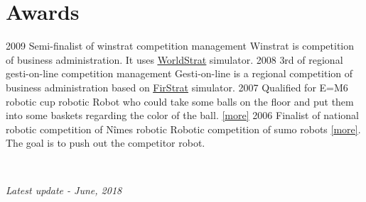 \documentclass[]{friggeri-cv}
\begin{document}
\section{Awards}
\begin{entrylist}
    \entry
        {2009}
	{Semi-finalist of winstrat competition}
        {management}
	{Winstrat is competition of business administration. It uses \href{http://www.stratelogic.com/worldstrat/}{\underline{WorldStrat}} simulator.}
    \entry
        {2008}
	{3rd of regional gesti-on-line competition}
        {management}
	{Gesti-on-line is a regional competition of business administration based on \href{http://www.stratelogic.com/firstrat/}{\underline{FirStrat}} simulator.}
    \entry
        {2007}
	{Qualified for E=M6 robotic cup}
        {robotic}
	{Robot who could take some balls on the floor and put them into some baskets regarding the color of the ball. \href{https://www.coupederobotique.fr/}{[\underline{more}]}}
    \entry
        {2006}
	{Finalist of national robotic competition of Nîmes}
        {robotic}
	{Robotic competition of sumo robots \href{http://www.robot-sumo.fr/}{[\underline{more}]}. The goal is to push out the competitor robot. }
\end{entrylist}
~
\begin{flushright}
    \emph{Latest update - June, 2018}
\end{flushright}

\begin{aside}
~
~
~
\end{aside}
\end{document}
